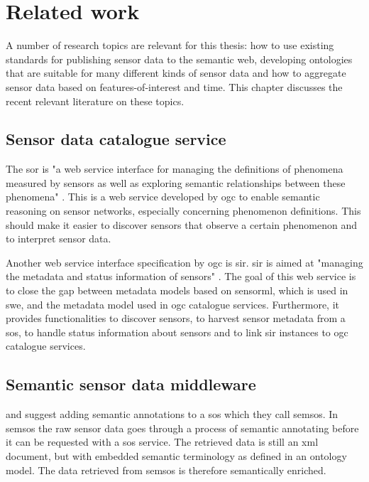 \chapter{Related work}
\label{chap:rw}
A number of research topics are relevant for this thesis: how to use existing standards for publishing sensor data to the semantic web, developing ontologies that are suitable for many different kinds of sensor data and how to aggregate sensor data based on features-of-interest and time. This chapter discusses the recent relevant literature on these topics.     

\section{Sensor data catalogue service}
The \ac{sor} is "a web service interface for managing the definitions of phenomena measured by sensors as well as exploring semantic relationships between these phenomena" \cite[p. vi]{SW:OGC4}. This is a web service developed by \ac{ogc} to enable semantic reasoning on sensor networks, especially concerning phenomenon definitions. This should make it easier to discover sensors that observe a certain phenomenon and to interpret sensor data.

Another web service interface specification by \ac{ogc} is \ac{sir}. \ac{sir} is aimed at "managing the metadata and status information of sensors" \cite[p. xii]{SW:OGC3}. The goal of this web service is to close the gap between metadata models based on \ac{sensorml}, which is used in \ac{swe}, and the metadata model used in \ac{ogc} catalogue services. Furthermore, it provides functionalities to discover sensors, to harvest sensor metadata from a \ac{sos}, to handle status information about sensors and to link \ac{sir} instances to \ac{ogc} catalogue services. 

\section{Semantic sensor data middleware}
\cite{SSW:Henson} and \cite{SSW:Pschorr} suggest adding semantic annotations to a \ac{sos} which they call \ac{semsos}. In \ac{semsos} the raw sensor data goes through a process of semantic annotating before it can be requested with a \ac{sos} service. The retrieved data is still an \ac{xml} document, but with embedded semantic terminology as defined in an ontology model. The data retrieved from \ac{semsos} is therefore semantically enriched.  

